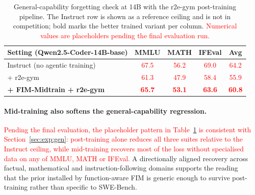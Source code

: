 \begin{table}[h]
\centering
\caption{General-capability forgetting check at 14B with the r2e-gym
post-training pipeline. The Instruct row is shown as a reference ceiling
and is not in competition; bold marks the better trained variant per
column. \textcolor{red}{Numerical values are placeholders pending the
final evaluation run.}}
\label{tab:forgetting}
\small
\setlength{\tabcolsep}{6pt}
\begin{tabular}{lcccc}
\toprule
Setting (Qwen2.5-Coder-14B-base) & MMLU & MATH & IFEval & Avg \\
\midrule
Instruct (no agentic training)
  & \textcolor{red}{67.5} & \textcolor{red}{56.2} & \textcolor{red}{69.0}
  & \textcolor{red}{64.2} \\
+ r2e-gym
  & \textcolor{red}{61.3} & \textcolor{red}{47.9} & \textcolor{red}{58.4}
  & \textcolor{red}{55.9} \\
\textbf{+ FIM-Midtrain + r2e-gym}
  & \textbf{\textcolor{red}{65.7}}
  & \textbf{\textcolor{red}{53.1}}
  & \textbf{\textcolor{red}{63.6}}
  & \textbf{\textcolor{red}{60.8}} \\
\bottomrule
\end{tabular}
\end{table}

\paragraph{Mid-training also softens the general-capability regression.}
\textcolor{red}{Pending the final evaluation, the placeholder pattern in
Table~\ref{tab:forgetting} is consistent with Section~\ref{sec:exp:gen}:
post-training alone reduces all three suites relative to the Instruct
ceiling, while mid-training recovers most of the loss without specialised
data on any of MMLU, MATH or IFEval.} A directionally aligned recovery
across factual, mathematical and instruction-following domains supports
the reading that the prior installed by function-aware FIM is generic
enough to survive post-training rather than specific to SWE-Bench.
